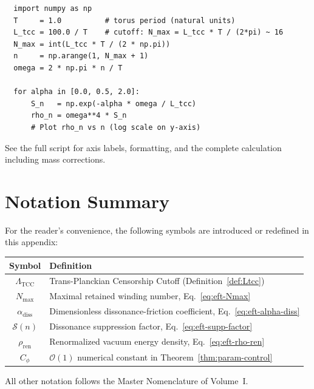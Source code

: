 \documentclass[12pt,openany]{book}
\theoremstyle{plain}
\theoremstyle{definition}
\theoremstyle{remark}
\providecommand{\Ltcc}{\Lambda_{\mathrm{TCC}}}
\providecommand{\Nmax}{N_{\max}}
\providecommand{\order}[1]{\mathcal{O}\!\left(#1\right)}
\providecommand{\Ren}{\mathrm{ren}}
\providecommand{\diss}{\mathrm{diss}}
\begin{document}
\begin{verbatim}
  import numpy as np
  T     = 1.0          # torus period (natural units)
  L_tcc = 100.0 / T    # cutoff: N_max = L_tcc * T / (2*pi) ~ 16
  N_max = int(L_tcc * T / (2 * np.pi))
  n     = np.arange(1, N_max + 1)
  omega = 2 * np.pi * n / T

  for alpha in [0.0, 0.5, 2.0]:
      S_n   = np.exp(-alpha * omega / L_tcc)
      rho_n = omega**4 * S_n
      # Plot rho_n vs n (log scale on y-axis)
\end{verbatim}

\noindent
See the full script for axis labels, formatting, and the complete
calculation including mass corrections.


\section*{Notation Summary}

For the reader's convenience, the following symbols are introduced or
redefined in this appendix:

\begin{center}
\renewcommand{\arraystretch}{1.2}
\begin{tabular}{cl}
\hline
\textbf{Symbol} & \textbf{Definition} \\
\hline
$\Ltcc$ & Trans-Planckian Censorship Cutoff (Definition~\ref{def:Ltcc}) \\
$\Nmax$ & Maximal retained winding number, Eq.~\eqref{eq:eft-Nmax} \\
$\alpha_{\diss}$ & Dimensionless dissonance-friction coefficient,
  Eq.~\eqref{eq:eft-alpha-diss} \\
$\mathcal{S}(n)$ & Dissonance suppression factor, Eq.~\eqref{eq:eft-supp-factor} \\
$\rho_{\Ren}$ & Renormalized vacuum energy density, Eq.~\eqref{eq:eft-rho-ren} \\
$C_{\phi}$ & $\order{1}$ numerical constant in Theorem~\ref{thm:param-control} \\
\hline
\end{tabular}
\end{center}

\noindent
All other notation follows the Master Nomenclature of Volume~I.
\end{document}
